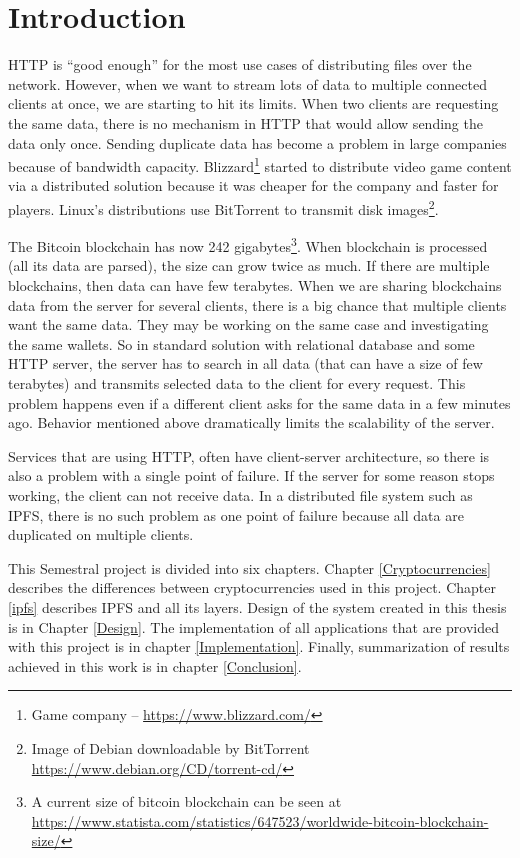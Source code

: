 \chapter{Introduction}


HTTP is ``good enough'' for the most use cases of distributing files over the network. However, when we want to stream lots of data to multiple connected clients at once, we are starting to hit its limits. When two clients are requesting the same data, there is no mechanism in HTTP that would allow sending the data only once. Sending duplicate data has become a problem in large companies because of bandwidth capacity. Blizzard\footnote{Game company -- \url{https://www.blizzard.com/}} started to distribute video game content via a distributed solution because it was cheaper for the company and faster for players\cite{BigDataInVideoGames}. Linux's distributions use BitTorrent to transmit disk images\footnote{Image of Debian downloadable by BitTorrent \url{https://www.debian.org/CD/torrent-cd/}}.

The Bitcoin blockchain has now 242 gigabytes\footnote{A current size of bitcoin blockchain can be seen at \url{https://www.statista.com/statistics/647523/worldwide-bitcoin-blockchain-size/}}. When blockchain is processed (all its data are parsed), the size can grow twice as much. If there are multiple blockchains, then data can have few terabytes. When we are sharing blockchains data from the server for several clients, there is a big chance that multiple clients want the same data. They may be working on the same case and investigating the same wallets. So in standard solution with relational database and some HTTP server, the server has to search in all data (that can have a size of few terabytes) and transmits selected data to the client for every request. This problem happens even if a different client asks for the same data in a few minutes ago. Behavior mentioned above dramatically limits the scalability of the server.

Services that are using HTTP, often have client-server architecture, so there is also a problem with a single point of failure. If the server for some reason stops working, the client can not receive data. In a distributed file system such as IPFS, there is no such problem as one point of failure because all data are duplicated on multiple clients.

This Semestral project is divided into six chapters. Chapter \ref{Cryptocurrencies} describes the differences between cryptocurrencies used in this project. Chapter \ref{ipfs} describes IPFS and all its layers. Design of the system created in this thesis is in Chapter \ref{Design}. The implementation of all applications that are provided with this project is in chapter \ref{Implementation}. Finally, summarization of results achieved in this work is in chapter \ref{Conclusion}.